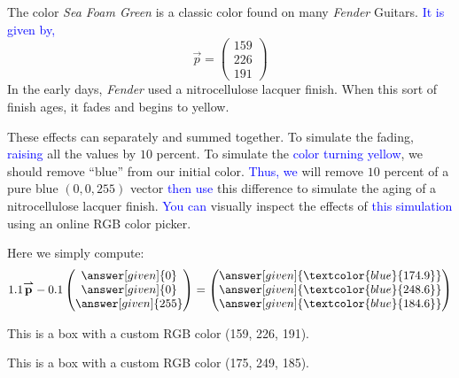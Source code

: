 \documentclass{ximera}
\begin{document}
\begin{example}
  The color \textit{Sea Foam Green} is a classic color found on many \textit{Fender} Guitars. \textcolor{blue}{It is given by,}
  \[
  \vec{p} =
  \begin{pmatrix}
    159 \\ 226 \\ 191
  \end{pmatrix}
  \]
  In the early days, \textit{Fender} used a nitrocellulose lacquer
  finish. When this sort of finish ages, it fades and begins to
  yellow.

  These effects can separately and summed together. To simulate the
  fading, \textcolor{blue}{raising} all the values by $10$ percent. To simulate the
  \textcolor{blue}{color turning yellow}, we should remove ``blue'' from our initial color. \textcolor{blue}{Thus, we} will
  remove $10$ percent of a pure blue $(0,0,255)$ vector \textcolor{blue}{then use} this
  difference to simulate the aging of a nitrocellulose lacquer
  finish. \textcolor{blue}{You can} visually inspect the effects of \textcolor{blue}{this simulation} using an online RGB color picker.
  \begin{explanation}
    Here we simply compute:
    \[
    1.1 \vec{p} - 0.1  \begin{pmatrix} \answer[given]{0} \\  \answer[given]{0} \\  \answer[given]{255} \end{pmatrix}
    = \begin{pmatrix} \answer[given]{\textcolor{blue}{174.9}} \\  \answer[given]{\textcolor{blue}{248.6}} \\  \answer[given]{\textcolor{blue}{184.6}} \end{pmatrix}
    \]
    \colorbox[rgb]{0.624, 0.886, 0.749}{%
  \parbox{\dimexpr\linewidth-2\fboxsep\relax}{%
    This is a box with a custom RGB color (159, 226, 191).
    }}

    \colorbox[rgb]{0.686, 0.976, 0.725}{%
  \parbox{\dimexpr\linewidth-2\fboxsep\relax}{%
    This is a box with a custom RGB color (175, 249, 185).
    }}
  \end{explanation}
\end{example}
\end{document}
